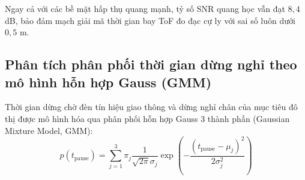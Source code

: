 \begin{table}[H]
\centering
\caption{Đo đạc cường độ quang thông phản xạ và sai số cự ly ToF tương ứng theo vật liệu mục tiêu}
\label{tab:target-reflectivity-brdf-table}
\end{table}

Ngay cả với các bề mặt hấp thụ quang mạnh, tỷ số SNR quang học vẫn đạt $8{,}4$ dB, bảo đảm mạch giải mã thời gian bay ToF đo đạc cự ly với sai số luôn dưới $0{,}5$ m.

\subsection{Phân tích phân phối thời gian dừng nghỉ theo mô hình hỗn hợp Gauss (GMM)}

\hspace{0.5cm} Thời gian dừng chờ đèn tín hiệu giao thông và dừng nghỉ chân của mục tiêu đô thị được mô hình hóa qua phân phối hỗn hợp Gauss 3 thành phần (Gaussian Mixture Model, GMM):
\begin{equation}
p(t_{\text{pause}}) = \sum_{j=1}^3 \pi_j \frac{1}{\sqrt{2\pi}\sigma_j} \exp \left( - \frac{(t_{\text{pause}} - \mu_j)^2}{2\sigma_j^2} \right)
\label{eq:gmm-pause-duration-formula}
\end{equation}

